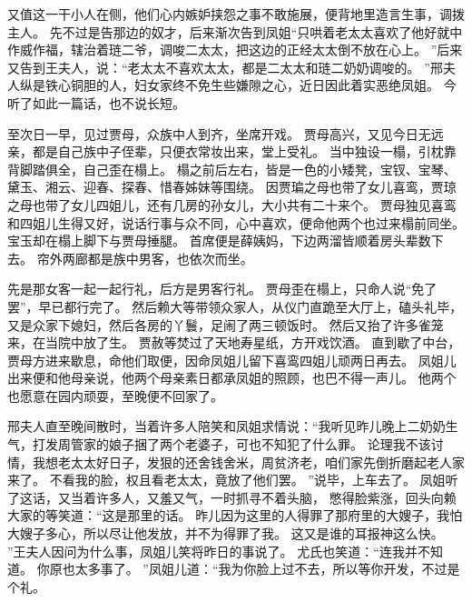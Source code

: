 又值这一干小人在侧，他们心内嫉妒挟怨之事不敢施展，便背地里造言生事，调拨主人。
先不过是告那边的奴才，后来渐次告到凤姐“只哄着老太太喜欢了他好就中作威作福，辖治着琏二爷，调唆二太太，把这边的正经太太倒不放在心上。
”后来又告到王夫人，说：“老太太不喜欢太太，都是二太太和琏二奶奶调唆的。
”邢夫人纵是铁心铜胆的人，妇女家终不免生些嫌隙之心，近日因此着实恶绝凤姐。
今听了如此一篇话，也不说长短。
\par
至次日一早，见过贾母，众族中人到齐，坐席开戏。
贾母高兴，又见今日无远亲，都是自己族中子侄辈，只便衣常妆出来，堂上受礼。
当中独设一榻，引枕靠背脚踏俱全，自己歪在榻上。
榻之前后左右，皆是一色的小矮凳，宝钗、宝琴、黛玉、湘云、迎春、探春、惜春姊妹等围绕。
因贾㻞之母也带了女儿喜鸾，贾琼之母也带了女儿四姐儿，还有几房的孙女儿，大小共有二十来个。
贾母独见喜鸾和四姐儿生得又好，说话行事与众不同，心中喜欢，便命他两个也过来榻前同坐。
宝玉却在榻上脚下与贾母捶腿。
首席便是薛姨妈，下边两溜皆顺着房头辈数下去。
帘外两廊都是族中男客，也依次而坐。
\par
先是那女客一起一起行礼，后方是男客行礼。
贾母歪在榻上，只命人说“免了罢”，早已都行完了。
然后赖大等带领众家人，从仪门直跪至大厅上，磕头礼毕，又是众家下媳妇，然后各房的丫鬟，足闹了两三顿饭时。
然后又抬了许多雀笼来，在当院中放了生。
贾赦等焚过了天地寿星纸，方开戏饮酒。
直到歇了中台，贾母方进来歇息，命他们取便，因命凤姐儿留下喜鸾四姐儿顽两日再去。
凤姐儿出来便和他母亲说，他两个母亲素日都承凤姐的照顾，也巴不得一声儿。
他两个也愿意在园内顽耍，至晚便不回家了。
\par
邢夫人直至晚间散时，当着许多人陪笑和凤姐求情说：“我听见昨儿晚上二奶奶生气，打发周管家的娘子捆了两个老婆子，可也不知犯了什么罪。
论理我不该讨情，我想老太太好日子，发狠的还舍钱舍米，周贫济老，咱们家先倒折磨起老人家来了。
不看我的脸，权且看老太太，竟放了他们罢。
”说毕，上车去了。
凤姐听了这话，又当着许多人，又羞又气，一时抓寻不着头脑，
憋得脸紫涨，回头向赖大家的等笑道：“这是那里的话。
昨儿因为这里的人得罪了那府里的大嫂子，我怕大嫂子多心，所以尽让他发放，并不为得罪了我。
这又是谁的耳报神这么快。
”王夫人因问为什么事，凤姐儿笑将昨日的事说了。
尤氏也笑道：“连我并不知道。
你原也太多事了。
”凤姐儿道：“我为你脸上过不去，所以等你开发，不过是个礼。
